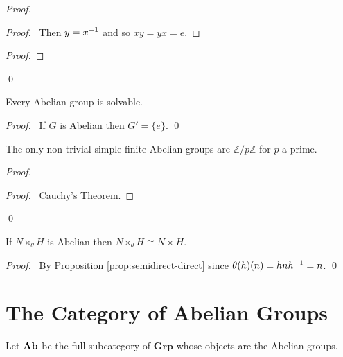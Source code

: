 \begin{proof}
\pf
{}
\begin{proof}
	\pf\ Then $y = {x}^{-1}$ and so $xy = yx = e$.
\end{proof}
\begin{proof}
\end{proof}
\qed
\end{proof}

\begin{prop}
Every Abelian group is solvable.
\end{prop}

\begin{proof}
\pf\ If $G$ is Abelian then $G' = \{e\}$. \qed
\end{proof}

\begin{prop}
The only non-trivial simple finite Abelian groups are $\mathbb{Z} / p \mathbb{Z}$ for $p$ a prime.
\end{prop}

\begin{proof}
\pf
{}
\begin{proof}
	\pf\ Cauchy's Theorem.
\end{proof}
\qed
\end{proof}

\begin{prop}
If $N \rtimes_\theta H$ is Abelian then $N \rtimes_\theta H \cong N \times H$.
\end{prop}

\begin{proof}
\pf\ By Proposition \ref{prop:semidirect-direct} since $\theta(h)(n) = hn{h}^{-1} = n$. \qed
\end{proof}

\section{The Category of Abelian Groups}

\begin{df}
    Let $\mathbf{Ab}$ be the full subcategory of $\mathbf{Grp}$ whose objects are the Abelian groups.
\end{df}

